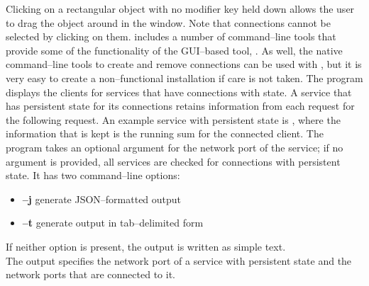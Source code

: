 Clicking on a rectangular object with no modifier key held down allows the user to drag
the object around in the window.
Note that connections cannot be selected by clicking on them.
\secondaryEnd{}
\newpage
{}
\mplusm{} includes a number of command--line tools that provide some of the functionality
of the GUI--based tool, .
As well, the native \yarp{} command--line tools to create and remove connections can be
used with \mplusm{}, but it is very easy to create a non--functional installation if care
is not taken.
The program  displays the clients for services that have
connections with state.
A service that has persistent state for its connections retains information from each
request for the following request.
An example service with persistent state is
, where the information that is kept is the
running sum for the connected client.
The program takes an optional argument for the \yarp{} network port of the service; if no
argument is provided, all services are checked for connections with persistent state.
It has two command--line options:
\begin{itemize}
\item \textbf{--j} generate JSON--formatted output
\item \textbf{--t} generate output in tab--delimited form
\end{itemize}
If neither option is present, the output is written as simple text.\\

The output specifies the \yarp{} network port of a service with persistent state and the
\yarp{} network ports that are connected to it.\\

